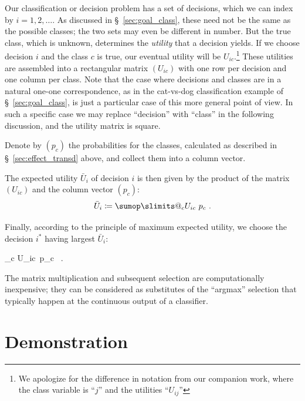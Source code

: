 \documentclass[\ifafour a4paper,12pt,\else a5paper,10pt,\fi%
onecolumn,oneside,article,%
british%
]{memoir}
\makeatletter
\newcommand*{\widefbox}[1]{\fbox{\hspace{1em}#1\hspace{1em}}}
\theoremstyle{remark}
\theoremstyle{innote}
\def\sum{\DOTSI\sumop\slimits@}
\newcommand*{\defd}{\coloneqq}
\DeclarePairedDelimiter\set{\{}{\}} %
\renewcommand*{\|}[1][]{\nonscript\:#1\vert\nonscript\:\mathopen{}}
\newcommand*{\sect}{\S}%
\DeclareMathOperator*{\argmax}{arg\,max}
\newcommand*{\eu}{\bar{U}}
\makeatother
\begin{document}
Our classification or decision problem has a set of decisions, which we can index by $i = 1,2,\dotsc$. As discussed in \sect~\ref{sec:goal_class}, these need not be the same as the possible classes; the two sets may even be different in number. But the true class, which is unknown, determines the \emph{utility} that a decision yields. If we choose decision $i$ and the class $c$ is true, our eventual utility will be $U_{ic}$.\footnote{We apologize for the difference in notation from our companion work, where the class variable is \enquote{$j$} and the utilities \enquote{$U_{ij}$}} These utilities are assembled into a rectangular matrix $(U_{ic})$ with one row per decision and one column per class. Note that the case where decisions and classes are in a natural one-one correspondence, as in the cat-vs-dog classification example of \sect~\ref{sec:goal_class}, is just a particular case of this more general point of view. In such a specific case we may replace \enquote{decision} with \enquote{class} in the following discussion, and the utility matrix is square.

Denote by $(p_{c})$ the probabilities for the classes, calculated as described in \sect~\ref{sec:effect_transd} above, and collect them into a column vector.

The expected utility $\eu_{i}$ of decision $i$ is then given by the product of the matrix $(U_{ic})$ and the column vector $(p_{c})$:
\begin{equation}
  \label{eq:expe_utilities}
  \eu_{i} \defd \sum_{c} U_{ic}\ p_{c} \ .
\end{equation}

Finally, according to the principle of maximum expected utility, we choose the decision $i^{*}$ having largest $\eu_{i}$:
\begin{empheq}[box=\widefbox]{equation}
  \label{eq:max_expe_utility}
  \text{choose}\quad
  i^{*} = \argmax_{i}\set*{\eu_{i}} \equiv \argmax_{i}\set[\bigg]{\sum_{c} U_{ic}\ p_{c}} \ .
\end{empheq}

The matrix multiplication and subsequent selection are computationally inexpensive; they can be considered as substitutes of the \enquote{argmax} selection that typically happen at the continuous output of a classifier.

\section{Demonstration}
\label{sec:demonstration}
\end{document}
